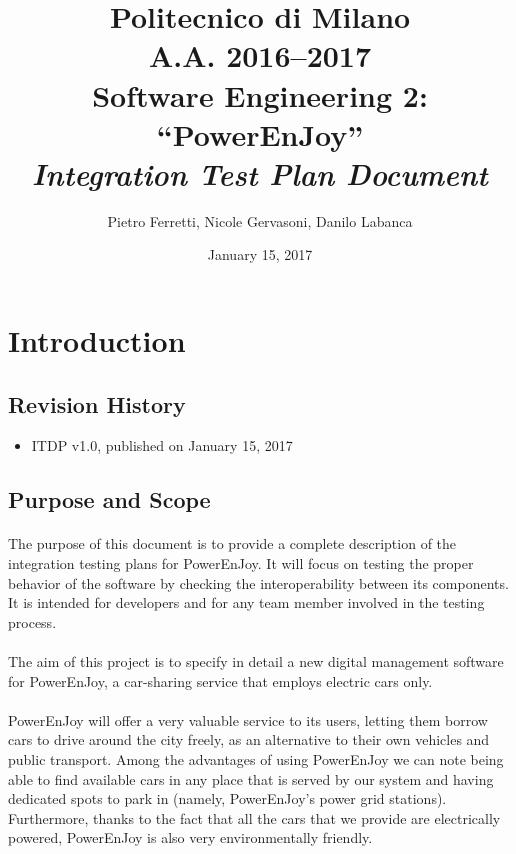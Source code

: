 \documentclass[english]{article}
\begin{document}
\title{Politecnico di Milano\\
 A.A. 2016–2017 \\
Software Engineering 2: “PowerEnJoy” \\
\emph{Integration Test Plan Document}}

\author{Pietro Ferretti, Nicole Gervasoni, Danilo Labanca}
\date{January 15, 2017}
\maketitle

\newpage

\tableofcontents{}

\newpage

\section{Introduction}

\subsection{Revision History}
\begin{itemize}
	\item{ITDP v1.0, published on January 15, 2017}
\end{itemize}
\subsection{Purpose and Scope}

\paragraph{}
The purpose of this document is to provide a complete description of the integration testing plans for PowerEnJoy. It will focus on testing the proper behavior of the software by checking the 
interoperability between its components.
It is intended for developers and for any team member involved in the testing process.

\paragraph{}
The aim of this project is to specify in detail a new digital management software for PowerEnJoy, a car-sharing service that employs electric cars only.

\paragraph{}
PowerEnJoy will offer a very valuable service to its users, letting them borrow cars to drive around the city freely, as an alternative to their own vehicles and public transport.
Among the advantages of using PowerEnJoy we can note being able to find available cars in any place that is served by our system and having dedicated spots to park in (namely, PowerEnJoy's power grid stations).
Furthermore, thanks to the fact that all the cars that we provide are electrically powered, PowerEnJoy is also very environmentally friendly.
\end{document}
